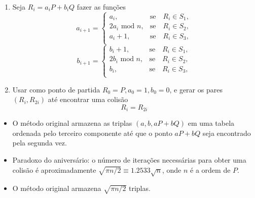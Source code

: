 \documentclass{beamer}
\newcounter{saveenumi}
\newcommand{\conti}{\setcounter{enumi}{\value{saveenumi}}}
\begin{document}
\begin{frame}
  \begin{enumerate}
    \conti
    \item Seja $R_i = a_iP + b_iQ$ fazer as funções
      $$
        a_{i+1}=\left\{\begin{array}{rc}
        a_i,&\mbox{se}\quad R_i \in S_1,\\
        2a_i \mbox{ mod }n,&\mbox{se}\quad R_i \in S_2,\\
        a_i + 1,&\mbox{se}\quad R_i \in S_3,\\
        \end{array}\right.
      $$
      $$
        b_{i+1}=\left\{\begin{array}{rc}
        b_i + 1,&\mbox{se}\quad R_i \in S_1,\\
        2b_i \mbox{ mod }n,&\mbox{se}\quad R_i \in S_2,\\
        b_i,&\mbox{se}\quad R_i \in S_3,\\
        \end{array}\right.
      $$
    \item Usar como ponto de partida $R_0 = P, a_0 = 1, b_0 = 0$, e gerar os pares $(R_i, R_{2i})$ até encontrar uma colisão
      $$ R_i = R_{2i} $$
    \conti
  \end{enumerate}
\end{frame}

%
%

\begin{frame}
  \begin{itemize}
    \item O método original armazena as triplas $(a,b,aP + bQ)$ em uma tabela ordenada pelo terceiro componente até que o ponto $aP+bQ$ seja encontrado pela segunda vez.
    \item Paradoxo do aniversário: o número de iterações necessárias para obter uma colisão é aproximadamente $\sqrt{\pi n / 2} \equiv 1.2533\sqrt{n}$, onde $n$ é a ordem de $P$.
    \item O método original armazena $\sqrt{\pi n / 2}$ triplas.
  \end{itemize} 
\end{frame}
\end{document}
